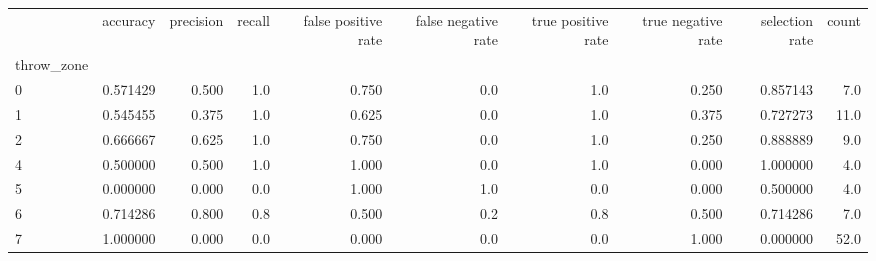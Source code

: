 \begin{tabular}{lrrrrrrrrr}
\toprule
{} &  accuracy &  precision &  recall &  false positive rate &  false negative rate &  true positive rate &  true negative rate &  selection rate &  count \\
throw\_zone &           &            &         &                      &                      &                     &                     &                 &        \\
\midrule
0          &  0.571429 &      0.500 &     1.0 &                0.750 &                  0.0 &                 1.0 &               0.250 &        0.857143 &    7.0 \\
1          &  0.545455 &      0.375 &     1.0 &                0.625 &                  0.0 &                 1.0 &               0.375 &        0.727273 &   11.0 \\
2          &  0.666667 &      0.625 &     1.0 &                0.750 &                  0.0 &                 1.0 &               0.250 &        0.888889 &    9.0 \\
4          &  0.500000 &      0.500 &     1.0 &                1.000 &                  0.0 &                 1.0 &               0.000 &        1.000000 &    4.0 \\
5          &  0.000000 &      0.000 &     0.0 &                1.000 &                  1.0 &                 0.0 &               0.000 &        0.500000 &    4.0 \\
6          &  0.714286 &      0.800 &     0.8 &                0.500 &                  0.2 &                 0.8 &               0.500 &        0.714286 &    7.0 \\
7          &  1.000000 &      0.000 &     0.0 &                0.000 &                  0.0 &                 0.0 &               1.000 &        0.000000 &   52.0 \\
\bottomrule
\end{tabular}
